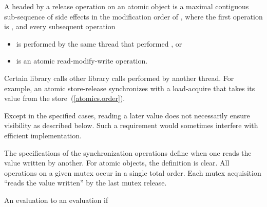 \pnum
A  headed by a release operation  on an atomic object
 is a maximal contiguous sub-sequence of
%
side effects in the
modification order of , where the first operation is , and
every subsequent operation

\begin{itemize}
\item is performed by the same thread that performed , or
\item is an atomic read-modify-write operation.
\end{itemize}

\pnum
Certain library calls  other library calls performed by
another thread. For example, an atomic store-release synchronizes with a
load-acquire that takes its value from the store~(\ref{atomics.order}).
\begin{note} Except in the specified cases, reading a later value does not
necessarily ensure visibility as described below. Such a requirement would
sometimes interfere with efficient implementation. \end{note} \begin{note} The
specifications of the synchronization operations define when one reads the value
written by another. For atomic objects, the definition is clear. All operations
on a given mutex occur in a single total order. Each mutex acquisition ``reads
the value written'' by the last mutex release. \end{note}

\pnum
An evaluation   to an evaluation  if

